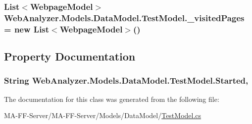 \subsubsection[{\+\_\+visited\+Pages}]{\setlength{\rightskip}{0pt plus 5cm}List$<${\bf Webpage\+Model}$>$ Web\+Analyzer.\+Models.\+Data\+Model.\+Test\+Model.\+\_\+visited\+Pages = new List$<${\bf Webpage\+Model}$>$()\hspace{0.3cm}{\ttfamily [private]}}\label{class_web_analyzer_1_1_models_1_1_data_model_1_1_test_model_a849d23a83d37ac0e965c3946d8085aa2}


\subsection{Property Documentation}
\hypertarget{class_web_analyzer_1_1_models_1_1_data_model_1_1_test_model_acdb09845b9c3bc8582f78d2729524216}{}
\subsubsection[{Started}]{\setlength{\rightskip}{0pt plus 5cm}String Web\+Analyzer.\+Models.\+Data\+Model.\+Test\+Model.\+Started\hspace{0.3cm}{\ttfamily [get]}, {\ttfamily [set]}}\label{class_web_analyzer_1_1_models_1_1_data_model_1_1_test_model_acdb09845b9c3bc8582f78d2729524216}


The documentation for this class was generated from the following file\+:\begin{DoxyCompactItemize}
\item 
M\+A-\/\+F\+F-\/\+Server/\+M\+A-\/\+F\+F-\/\+Server/\+Models/\+Data\+Model/\hyperlink{_test_model_8cs}{Test\+Model.\+cs}\end{DoxyCompactItemize}
